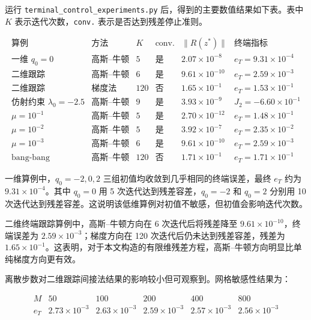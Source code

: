 \documentclass[UTF8,a4paper,zihao=-4]{ctexart}
\begin{document}
运行 \texttt{terminal\_control\_experiments.py} 后，得到的主要数值结果如下表。表中 $K$ 表示迭代次数，\texttt{conv.} 表示是否达到残差停止准则。

\[
\begin{array}{c|c|c|c|c|c}
\text{算例} & \text{方法} & K & \text{conv.} & \|R(z^*)\| & \text{终端指标}\\
\hline
\text{一维 }q_0=0 & \text{高斯--牛顿} & 5 & \text{是} & 2.07\times 10^{-8} & e_T=9.31\times 10^{-4}\\
\text{二维跟踪} & \text{高斯--牛顿} & 6 & \text{是} & 9.61\times 10^{-10} & e_T=2.59\times 10^{-3}\\
\text{二维跟踪} & \text{梯度法} & 120 & \text{否} & 1.65\times 10^{-1} & e_T=1.53\times 10^{-1}\\
\text{仿射约束 }\lambda_0=-2.5 & \text{高斯--牛顿} & 9 & \text{是} & 3.93\times 10^{-9} & J_2=-6.60\times 10^{-1}\\
\mu=10^{-1} & \text{高斯--牛顿} & 5 & \text{是} & 2.70\times 10^{-12} & e_T=1.48\times 10^{-1}\\
\mu=10^{-2} & \text{高斯--牛顿} & 5 & \text{是} & 3.92\times 10^{-7} & e_T=2.35\times 10^{-2}\\
\mu=10^{-3} & \text{高斯--牛顿} & 6 & \text{是} & 9.61\times 10^{-10} & e_T=2.59\times 10^{-3}\\
\text{bang-bang} & \text{高斯--牛顿} & 120 & \text{否} & 1.71\times 10^{-1} & e_T=1.71\times 10^{-1}
\end{array}
\]

一维算例中，$q_0=-2,0,2$ 三组初值均收敛到几乎相同的终端误差，最终 $e_T$ 约为 $9.31\times10^{-4}$。其中 $q_0=0$ 用 5 次迭代达到残差容差，$q_0=-2$ 和 $q_0=2$ 分别用 10 次迭代达到残差容差。这说明该低维算例对初值不敏感，但初值会影响迭代次数。

二维终端跟踪算例中，高斯--牛顿方向在 6 次迭代后将残差降至 $9.61\times10^{-10}$，终端误差为 $2.59\times10^{-3}$；梯度方向在 120 次迭代后仍未达到残差容差，残差为 $1.65\times10^{-1}$。这表明，对于本文构造的有限维残差方程，高斯--牛顿方向明显比单纯梯度方向更有效。

离散步数对二维跟踪间接法结果的影响较小但可观察到。网格敏感性结果为：

\[
\begin{array}{c|ccccc}
M & 50 & 100 & 200 & 400 & 800\\
\hline
e_T & 2.73{\times}10^{-3} & 2.63{\times}10^{-3} & 2.59{\times}10^{-3} & 2.57{\times}10^{-3} & 2.56{\times}10^{-3}
\end{array}
\]
\end{document}
